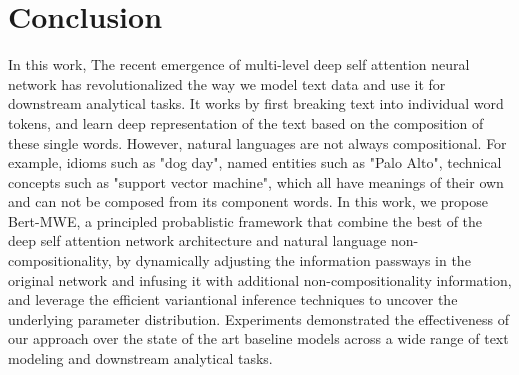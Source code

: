 \documentclass[conference]{IEEEtran}
\newcommand{\BertMWE}{\mbox{\sf Bert-MWE}\xspace}
\begin{document}
\section{Conclusion}
In this work, The recent emergence of multi-level deep self attention neural network has revolutionalized the way we model text data and use it for downstream analytical tasks. 
It works by first breaking text into individual word tokens, 
and learn deep representation of the text based on the composition of these single words.
However, natural languages are not always compositional.
For example, 
idioms such as "dog day", %
named entities such as "Palo Alto", 
technical concepts such as "support vector machine",
which all have meanings of their own and can not be composed from its component words.
In this work, 
we propose \BertMWE, a principled probablistic framework that combine the best of the deep self attention network architecture and natural language non-compositionality, 
by dynamically adjusting the information passways in the original network and infusing it with additional non-compositionality information,
and leverage the efficient variantional inference techniques to uncover the underlying parameter  distribution.
Experiments demonstrated the effectiveness of our approach over the state of the art baseline models across a wide range of text modeling and downstream analytical tasks.





\balance



\end{document}
